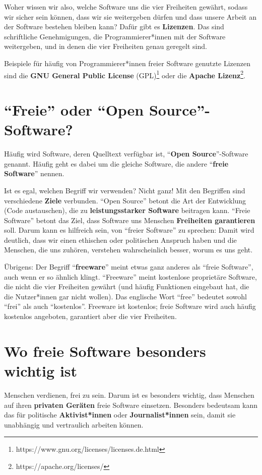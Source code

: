 \documentclass[a5paper,12pt]{scrartcl}
\begin{document}
Woher wissen wir also, welche Software uns die vier Freiheiten
gewährt, sodass wir sicher sein können, dass wir sie weitergeben
dürfen und dass unsere Arbeit an der Software bestehen bleiben kann?
Dafür gibt es \textbf{Lizenzen}. Das sind schriftliche Genehmigungen,
die Programmierer*innen mit der Software weitergeben, und in denen die
vier Freiheiten genau geregelt sind.

Beispiele für häufig von Programmierer*innen freier Software genutzte
Lizenzen sind die \textbf{GNU General Public License}
(GPL)\footnote{https://www.gnu.org/licenses/licenses.de.html} oder die
\textbf{Apache Lizenz}\footnote{https://apache.org/licenses/}.


\section{"`Freie"' oder "`Open Source"'-Software?}

Häufig wird Software, deren Quelltext verfügbar ist, "`\textbf{Open
  Source}"'-Software genannt. Häufig geht es dabei um die gleiche
Software, die andere "`\textbf{freie Software}"' nennen.

Ist es egal, welchen Begriff wir verwenden? Nicht ganz! Mit den
Begriffen sind verschiedene \textbf{Ziele} verbunden. "`Open Source"'
betont die Art der Entwicklung (Code austauschen), die zu
\textbf{leistungsstarker Software} beitragen kann. "`Freie Software"'
betont das Ziel, dass Software uns Menschen \textbf{Freiheiten
  garantieren} soll. Darum kann es hilfreich sein, von "`freier
Software"' zu sprechen: Damit wird deutlich, dass wir einen ethischen
oder politischen Anspruch haben und die Menschen, die uns zuhören,
verstehen wahrscheinlich besser, worum es uns geht.

Übrigens: Der Begriff "`\textbf{freeware}"' meint etwas ganz anderes
als "`freie Software"', auch wenn er so ähnlich klingt. "`Freeware"'
meint kostenlose proprietäre Software, die nicht die vier Freiheiten
gewährt (und häufig Funktionen eingebaut hat, die die Nutzer*innen gar
nicht wollen). Das englische Wort "`free"' bedeutet sowohl "`frei"'
als auch "`kostenlos"'. Freeware ist kostenlos; freie Software wird
auch häufig kostenlos angeboten, garantiert aber die vier Freiheiten.


\section{Wo freie Software besonders wichtig ist}

Menschen verdienen, frei zu sein. Darum ist es besonders wichtig, dass
Menschen auf ihren \textbf{privaten Geräten} freie Software
einsetzen. Besonders bedeutsam kann das für politische
\textbf{Aktivist*innen} oder \textbf{Journalist*innen} sein, damit sie
unabhängig und vertraulich arbeiten können.
\end{document}
